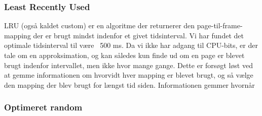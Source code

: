 	\subsubsection{Least Recently Used}
	LRU (også kaldet custom) er en algoritme der returnerer den page-til-frame-mapping der er brugt mindst indenfor et givet tidsinterval. Vi har fundet det optimale tidsinterval til være ~500 ms. Da vi ikke har adgang til CPU-bits, er der tale om en approksimation, og kan således kun finde ud om en page er blevet brugt indenfor intervallet, men ikke hvor mange gange. Dette er forsøgt løst ved at gemme informationen om hvorvidt hver mapping er blevet brugt, og så vælge den mapping der blev brugt for længst tid siden. Informationen gemmer hvornår 
	\subsubsection{Optimeret random}

